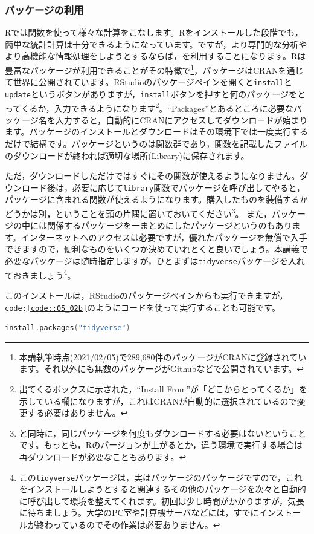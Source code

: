 \documentclass{ltjbook}
\begin{document}
\subsubsection{パッケージの利用}
\label{HowToUseRpackage}
Rでは関数を使って様々な計算をこなします。Rをインストールした段階でも，簡単な統計計算は十分できるようになっています。ですが，より専門的な分析やより高機能な情報処理をしようとするならば，を利用することになります。Rは豊富なパッケージが利用できることがその特徴で\footnote{本講執筆時点(2021/02/05)で289,680件のパッケージがCRANに登録されています。それ以外にも無数のパッケージがGithubなどで公開されています。}，パッケージはCRANを通じて世界に公開されています。RStudioのパッケージペインを開くと\texttt{install}と\texttt{update}というボタンがありますが，\texttt{install}ボタンを押すと何のパッケージをとってくるか，入力できるようになります\footnote{出てくるボックスに示された，``Install From''が「どこからとってくるか」を示している欄になりますが，これはCRANが自動的に選択されているので変更する必要はありません。}。``Packages''とあるところに必要なパッケージ名を入力すると，自動的にCRANにアクセスしてダウンロードが始まります。パッケージのインストールとダウンロードはその環境下では一度実行するだけで結構です。パッケージというのは関数群であり，関数を記載したファイルのダウンロードが終われば適切な場所(Library)に保存されます。

ただ，ダウンロードしただけではすぐにその関数が使えるようになりません。ダウンロード後は，必要に応じて\texttt{library}関数でパッケージを呼び出してやると，パッケージに含まれる関数が使えるようになります。購入したものを装備するかどうかは別，ということを頭の片隅に置いておいてください\footnote{と同時に，同じパッケージを何度もダウンロードする必要はないということです。もっとも，Rのバージョンが上がるとか，違う環境で実行する場合は再ダウンロードが必要なこともあります。}。
また，パッケージの中には関係するパッケージを一まとめにしたパッケージというのもあります。インターネットへのアクセスは必要ですが，優れたパッケージを無償で入手できますので，便利なものをいくつか決めていれとくと良いでしょう。本講義で必要なパッケージは随時指定しますが，ひとまずは\texttt{tidyverse}パッケージ\citep{tidyverse}を入れておきましょう\footnote{この\texttt{tidyverse}パッケージは，実はパッケージのパッケージですので，これをインストールしようとすると関連するその他のパッケージを次々と自動的に呼び出して環境を整えてくれます。初回は少し時間がかかりますが，気長に待ちましょう。大学のPC室や計算機サーバなどには，すでにインストールが終わっているのでその作業は必要ありません。}。

このインストールは，RStudioのパッケージペインからも実行できますが，\texttt{code:\ref{code::05_02b}}のようにコードを使って実行することも可能です。
\begin{lstlisting}[language=c++,label={code::05_02b},caption={コードからインストールする}]
	install.packages("tidyverse")
\end{lstlisting}
\end{document}

